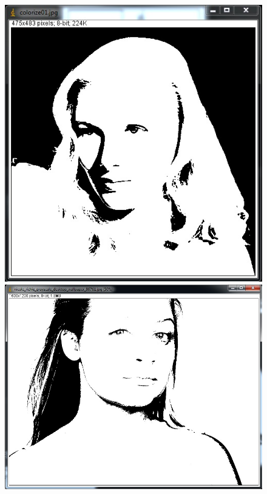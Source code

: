 
\begin{figure}[htbp] \centering
\begin{minipage}[b]{0.45\textwidth} \centering
\includegraphics[width=1.00\textwidth]{Pictures/Theory/SimpleThresholdAfter} %
\end{minipage} \hfill
\begin{minipage}[b]{0.45\textwidth} \centering
\includegraphics[width=1.00\textwidth]{Pictures/Theory/ComplicatedThresholdAfter} %

\end{minipage}
\end{figure}

